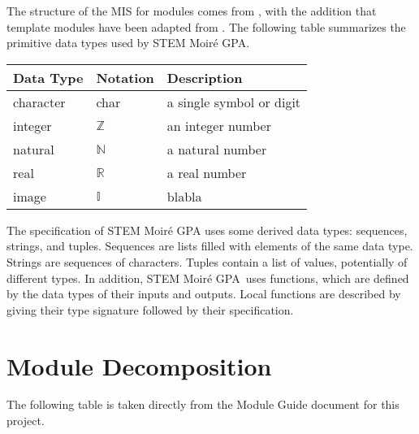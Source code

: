 \documentclass[12pt, titlepage]{article}
\newcommand{\progname}{STEM Moir{\'e} GPA}
\begin{document}
The structure of the MIS for modules comes from \cite{HoffmanAndStrooper1995},
with the addition that template modules have been adapted from
\cite{GhezziEtAl2003}. The following table summarizes the primitive data types used by \progname.

\iffalse
The mathematical notation comes from Chapter 3 of
\cite{HoffmanAndStrooper1995}.  For instance, the symbol := is used for a
multiple assignment statement and conditional rules follow the form $(c_1
\Rightarrow r_1 | c_2 \Rightarrow r_2 | ... | c_n \Rightarrow r_n )$.
\fi

\begin{center}
\renewcommand{\arraystretch}{1.2}
\noindent 
\begin{tabular}{l l p{7.5cm}} 
\toprule 
\textbf{Data Type} & \textbf{Notation} & \textbf{Description}\\ 
\midrule
character & char & a single symbol or digit\\
integer & $\mathbb{Z}$ & an integer number \\
natural & $\mathbb{N}$ & a natural number \\
real & $\mathbb{R}$ & a real number \\
image & $\mathbb{I}$ & blabla \\
\bottomrule
\end{tabular} 
\end{center}

\noindent
The specification of \progname{} uses some derived data types: sequences, strings, and
tuples. Sequences are lists filled with elements of the same data type. Strings
are sequences of characters. Tuples contain a list of values, potentially of
different types. In addition, \progname \ uses functions, which
are defined by the data types of their inputs and outputs. Local functions are
described by giving their type signature followed by their specification.

\section{Module Decomposition}

The following table is taken directly from the Module Guide document for this project.
\end{document}
